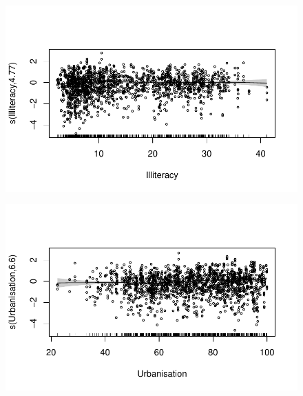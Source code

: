 \documentclass[
  letterpaper,
  DIV=11,
  numbers=noendperiod]{scrartcl}
\begin{document}
\begin{figure}[H]

{\centering \includegraphics{Group34Coursework_files/figure-pdf/unnamed-chunk-16-2.pdf}

}

\end{figure}

\begin{figure}[H]

{\centering \includegraphics{Group34Coursework_files/figure-pdf/unnamed-chunk-16-3.pdf}

}

\end{figure}
\end{document}
